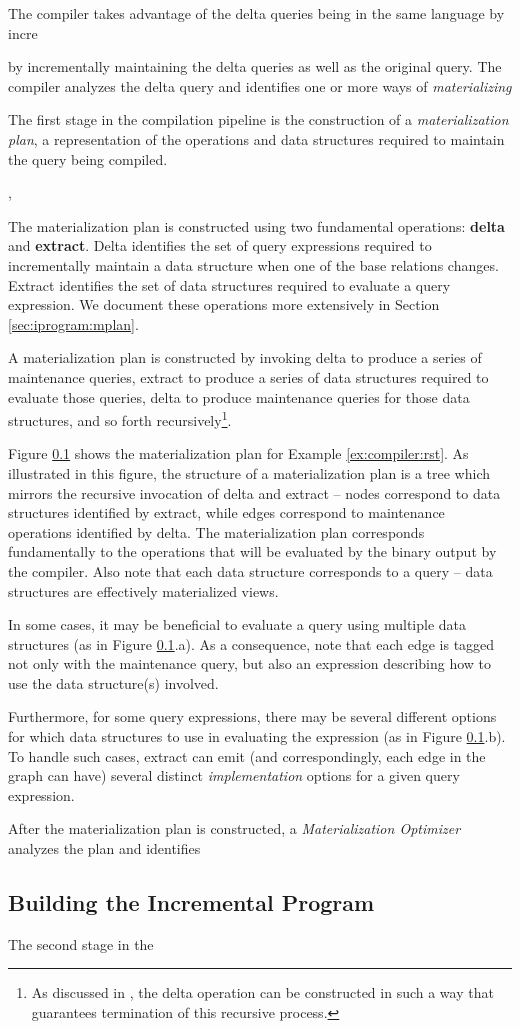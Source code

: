 The compiler takes advantage of the delta queries being in the same language by incre


 by incrementally maintaining the delta queries as well as the original query.  The compiler analyzes the delta query and identifies one or more ways of {\em materializing}


The first stage in the compilation pipeline is the construction of a {\em materialization plan}, a representation of the operations and data structures required to maintain the query being compiled.  


 \cite{kennedy-ahmad-koch-cidr:11}, 


The materialization plan is constructed using two fundamental operations: {\bf delta} and {\bf extract}.  Delta identifies the set of query expressions required to incrementally maintain a data structure when one of the base relations changes.  Extract identifies the set of data structures required to evaluate a query expression.  We document these operations more extensively in Section \ref{sec:iprogram:mplan}. 

A materialization plan is constructed by invoking delta to produce a series of maintenance queries, extract to produce a series of data structures required to evaluate those queries, delta to produce maintenance queries for those data structures, and so forth recursively\footnote{As discussed in \cite{dbtoaster-pods}, the delta operation can be constructed in such a way that guarantees termination of this recursive process.}.  

Figure \ref{} shows the materialization plan for Example \ref{ex:compiler:rst}.  As illustrated in this figure, the structure of a materialization plan is a tree which mirrors the recursive invocation of delta and extract -- nodes correspond to data structures identified by extract, while edges correspond to maintenance operations identified by delta.  The materialization plan corresponds fundamentally to the operations that will be evaluated by the binary output by the compiler.  Also note that each data structure corresponds to a query -- data structures are effectively materialized views.  

In some cases, it may be beneficial to evaluate a query using multiple data structures (as in Figure \ref{}.a).  As a consequence, note that each edge is tagged not only with the maintenance query, but also an expression describing how to use the data structure(s) involved.

Furthermore, for some query expressions, there may be several different options for which data structures to use in evaluating the expression (as in Figure \ref{}.b).  To handle such cases, extract can emit (and correspondingly, each edge in the graph can have) several distinct {\em implementation} options for a given query expression.  

After the materialization plan is constructed, a {\em Materialization Optimizer} analyzes the plan and identifies 

\subsection{Building the Incremental Program}
The second stage in the 
